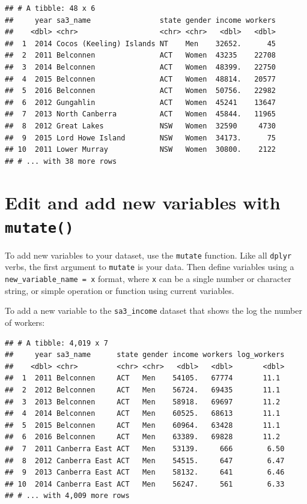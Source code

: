 \documentclass[]{book}
\newenvironment{Shaded}{\begin{snugshade}}{\end{snugshade}}
\newcommand{\DataTypeTok}[1]{\textcolor[rgb]{0.13,0.29,0.53}{#1}}
\newcommand{\KeywordTok}[1]{\textcolor[rgb]{0.13,0.29,0.53}{\textbf{#1}}}
\newcommand{\NormalTok}[1]{#1}
\newcommand{\OperatorTok}[1]{\textcolor[rgb]{0.81,0.36,0.00}{\textbf{#1}}}
\newcommand{\StringTok}[1]{\textcolor[rgb]{0.31,0.60,0.02}{#1}}
\begin{document}
\begin{verbatim}
## # A tibble: 48 x 6
##     year sa3_name                state gender income workers
##    <dbl> <chr>                   <chr> <chr>   <dbl>   <dbl>
##  1  2014 Cocos (Keeling) Islands NT    Men    32652.      45
##  2  2011 Belconnen               ACT   Women  43235    22708
##  3  2014 Belconnen               ACT   Women  48399.   22750
##  4  2015 Belconnen               ACT   Women  48814.   20577
##  5  2016 Belconnen               ACT   Women  50756.   22982
##  6  2012 Gungahlin               ACT   Women  45241    13647
##  7  2013 North Canberra          ACT   Women  45844.   11965
##  8  2012 Great Lakes             NSW   Women  32590     4730
##  9  2015 Lord Howe Island        NSW   Women  34173.      75
## 10  2011 Lower Murray            NSW   Women  30800.    2122
## # ... with 38 more rows
\end{verbatim}

\hypertarget{edit-and-add-new-variables-with-mutate}{%
\section{\texorpdfstring{Edit and add new variables with \texttt{mutate()}}{Edit and add new variables with mutate()}}\label{edit-and-add-new-variables-with-mutate}}

To add new variables to your dataset, use the \texttt{mutate} function. Like all \texttt{dplyr} verbs, the first argument to \texttt{mutate} is your data. Then define variables using a \texttt{new\_variable\_name\ =\ x} format, where \texttt{x} can be a single number or character string, or simple operation or function using current variables.

To add a new variable to the \texttt{sa3\_income} dataset that shows the log the number of workers:

\begin{Shaded}
\end{Shaded}

\begin{verbatim}
## # A tibble: 4,019 x 7
##     year sa3_name      state gender income workers log_workers
##    <dbl> <chr>         <chr> <chr>   <dbl>   <dbl>       <dbl>
##  1  2011 Belconnen     ACT   Men    54105.   67774       11.1 
##  2  2012 Belconnen     ACT   Men    56724.   69435       11.1 
##  3  2013 Belconnen     ACT   Men    58918.   69697       11.2 
##  4  2014 Belconnen     ACT   Men    60525.   68613       11.1 
##  5  2015 Belconnen     ACT   Men    60964.   63428       11.1 
##  6  2016 Belconnen     ACT   Men    63389.   69828       11.2 
##  7  2011 Canberra East ACT   Men    53139.     666        6.50
##  8  2012 Canberra East ACT   Men    54515.     647        6.47
##  9  2013 Canberra East ACT   Men    58132.     641        6.46
## 10  2014 Canberra East ACT   Men    56247.     561        6.33
## # ... with 4,009 more rows
\end{verbatim}
\end{document}
